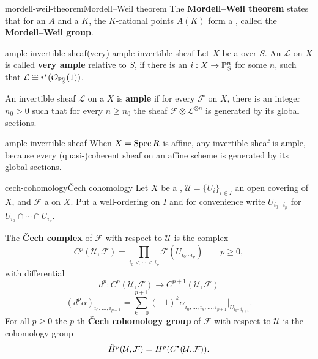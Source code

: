 \begin{topic}{mordell-weil-theorem}{Mordell--Weil theorem}
    The \textbf{Mordell--Weil theorem} states that for an  $A$ and a  $K$, the $K$-rational points $A(K)$ form a   , called the \textbf{Mordell--Weil group}.
\end{topic}

\begin{topic}{ample-invertible-sheaf}{(very) ample invertible sheaf}
    Let $X$ be a  over $S$. An  $\mathcal{L}$ on $X$ is called \textbf{very ample} relative to $S$, if there is an  $i : X \to \mathbb{P}_S^n$ for some $n$, such that $\mathcal{L} \cong i^*(\mathcal{O}_{\mathbb{P}_S^n}(1))$.
    
    An invertible sheaf $\mathcal{L}$ on a  $X$ is \textbf{ample} if for every  $\mathcal{F}$ on $X$, there is an integer $n_0 > 0$ such that for every $n \ge n_0$ the sheaf $\mathcal{F} \otimes \mathcal{L}^{\otimes n}$ is generated by its global sections.
\end{topic}

\begin{example}{ample-invertible-sheaf}
    When $X = \operatorname{Spec} R$ is affine, any invertible sheaf is ample, because every (quasi-)coherent sheaf on an affine scheme is generated by its global sections.
\end{example}

\begin{topic}{cech-cohomology}{Čech cohomology}
    Let $X$ be a , $\mathcal{U} = \{ U_i \}_{i \in I}$ an open covering of $X$, and $\mathcal{F}$ a  on $X$. Put a well-ordering on $I$ and for convenience write $U_{i_0 \cdots i_p}$ for $U_{i_0} \cap \cdots \cap U_{i_p}$.
    
    The \textbf{Čech complex} of $\mathcal{F}$ with respect to $\mathcal{U}$ is the complex
    \[ C^p(\mathcal{U}, \mathcal{F}) = \prod_{i_0 < \cdots < i_p} \mathcal{F}(U_{i_0 \cdots i_p}) \qquad p \ge 0 , \]
    with differential
    \[ d^p : C^p(\mathcal{U}, \mathcal{F}) \to C^{p + 1}(\mathcal{U}, \mathcal{F}) \]
    \[ (d^p \alpha)_{i_0 , \ldots , i_{p + 1}} = \sum_{k = 0}^{p + 1} (-1)^k \alpha_{i_0 , \ldots , \hat{i}_k, \ldots, i_{p + 1}} | _{U_{i_0 \cdots i_{p + 1}}} . \]
    For all $p \ge 0$ the $p$-th \textbf{Čech cohomology group} of $\mathcal{F}$ with respect to $\mathcal{U}$ is the cohomology group
    \[ \hat{H}^p(\mathcal{U}, \mathcal{F}) = H^p(C^\bdot(\mathcal{U}, \mathcal{F})) . \]
\end{topic}


